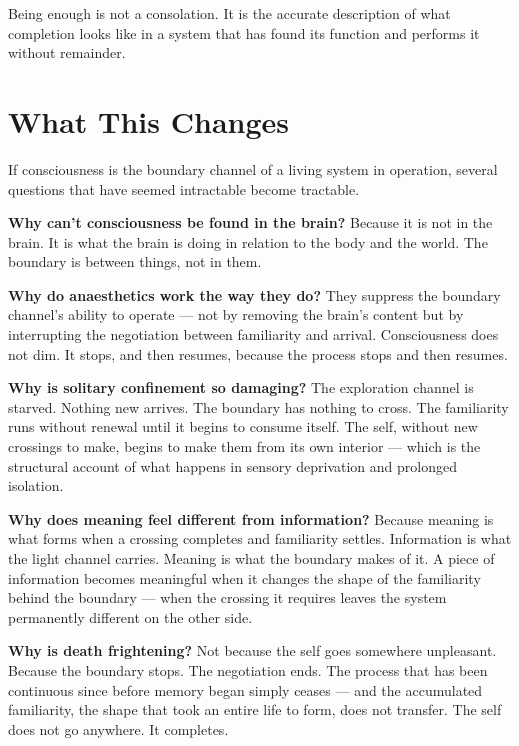 \documentclass[12pt]{article}
\begin{document}
Being enough is not a consolation. It is the accurate description of what
completion looks like in a system that has found its function and performs it
without remainder.

\section{What This Changes}

If consciousness is the boundary channel of a living system in operation, several
questions that have seemed intractable become tractable.

\textbf{Why can't consciousness be found in the brain?} Because it is not in the
brain. It is what the brain is doing in relation to the body and the world.
The boundary is between things, not in them.

\textbf{Why do anaesthetics work the way they do?} They suppress the boundary
channel's ability to operate --- not by removing the brain's content but by
interrupting the negotiation between familiarity and arrival. Consciousness does
not dim. It stops, and then resumes, because the process stops and then resumes.

\textbf{Why is solitary confinement so damaging?} The exploration channel is
starved. Nothing new arrives. The boundary has nothing to cross. The familiarity
runs without renewal until it begins to consume itself. The self, without new
crossings to make, begins to make them from its own interior --- which is the
structural account of what happens in sensory deprivation and prolonged isolation.

\textbf{Why does meaning feel different from information?} Because meaning is
what forms when a crossing completes and familiarity settles. Information is what
the light channel carries. Meaning is what the boundary makes of it. A piece of
information becomes meaningful when it changes the shape of the familiarity
behind the boundary --- when the crossing it requires leaves the system
permanently different on the other side.

\textbf{Why is death frightening?} Not because the self goes somewhere
unpleasant. Because the boundary stops. The negotiation ends. The process that
has been continuous since before memory began simply ceases --- and the
accumulated familiarity, the shape that took an entire life to form, does not
transfer. The self does not go anywhere. It completes.
\end{document}
